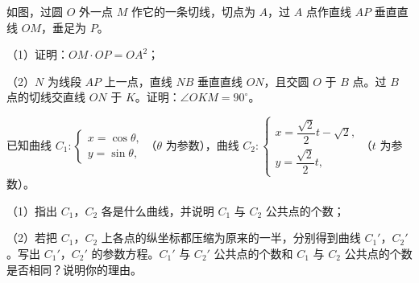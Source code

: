 \Needspace{0.4\textheight}
\begin{question}
如图，过圆 $O$ 外一点 $M$ 作它的一条切线，切点为 $A$，过 $A$ 点作直线 $AP$ 垂直直线 $OM$，垂足为 $P$。

（1）证明：$OM\cdot OP=OA^2$；

（2）$N$ 为线段 $AP$ 上一点，直线 $NB$ 垂直直线 $ON$，且交圆 $O$ 于 $B$ 点。过 $B$ 点的切线交直线 $ON$ 于 $K$。证明：$\angle OKM=90^\circ$。
\nopagebreak[4]
\begin{center}\end{center}
\nopagebreak[4]
\end{question}
\begin{question}
已知曲线 $C_1:\begin{cases}x=\cos\theta,\\ y=\sin\theta,\end{cases}$（$\theta$ 为参数），曲线 $C_2:\begin{cases}x=\dfrac{\sqrt2}2t-\sqrt2,\\ y=\dfrac{\sqrt2}2t,\end{cases}$（$t$ 为参数）。

（1）指出 $C_1$，$C_2$ 各是什么曲线，并说明 $C_1$ 与 $C_2$ 公共点的个数；

（2）若把 $C_1$，$C_2$ 上各点的纵坐标都压缩为原来的一半，分别得到曲线 $C_1'$，$C_2'$。写出 $C_1'$，$C_2'$ 的参数方程。$C_1'$ 与 $C_2'$ 公共点的个数和 $C_1$ 与 $C_2$ 公共点的个数是否相同？说明你的理由。

\end{question}